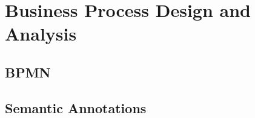 \chapter{Business Process Design and Analysis}

\section{BPMN}


\section{Semantic Annotations}

\FloatBarrier
\newpage